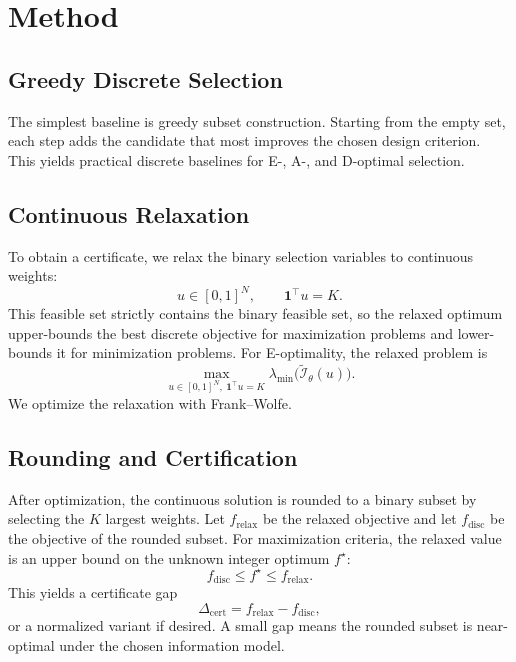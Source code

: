 \documentclass[11pt]{article}
\begin{document}
\section{Method}
\subsection{Greedy Discrete Selection}
The simplest baseline is greedy subset construction. Starting from the empty
set, each step adds the candidate that most improves the chosen design
criterion. This yields practical discrete baselines for E-, A-, and D-optimal
selection.

\subsection{Continuous Relaxation}
To obtain a certificate, we relax the binary selection variables to continuous
weights:
\begin{equation}
u \in [0,1]^N,
\qquad
\mathbf{1}^\top u = K.
\label{eq:relax}
\end{equation}
This feasible set strictly contains the binary feasible set, so the relaxed
optimum upper-bounds the best discrete objective for maximization problems and
lower-bounds it for minimization problems. For E-optimality, the relaxed problem
is
\begin{equation}
\max_{u \in [0,1]^N,\ \mathbf{1}^\top u = K}
\lambda_{\min}\!\bigl(\widetilde{\mathcal{I}}_\theta(u)\bigr).
\label{eq:e_relax}
\end{equation}
We optimize the relaxation with Frank--Wolfe.

\subsection{Rounding and Certification}
After optimization, the continuous solution is rounded to a binary subset by
selecting the $K$ largest weights. Let $f_{\mathrm{relax}}$ be the relaxed
objective and let $f_{\mathrm{disc}}$ be the objective of the rounded subset.
For maximization criteria, the relaxed value is an upper bound on the unknown
integer optimum $f^\star$:
\begin{equation}
f_{\mathrm{disc}} \leq f^\star \leq f_{\mathrm{relax}}.
\end{equation}
This yields a certificate gap
\begin{equation}
\Delta_{\mathrm{cert}} = f_{\mathrm{relax}} - f_{\mathrm{disc}},
\end{equation}
or a normalized variant if desired. A small gap means the rounded subset is
near-optimal under the chosen information model.
\end{document}
